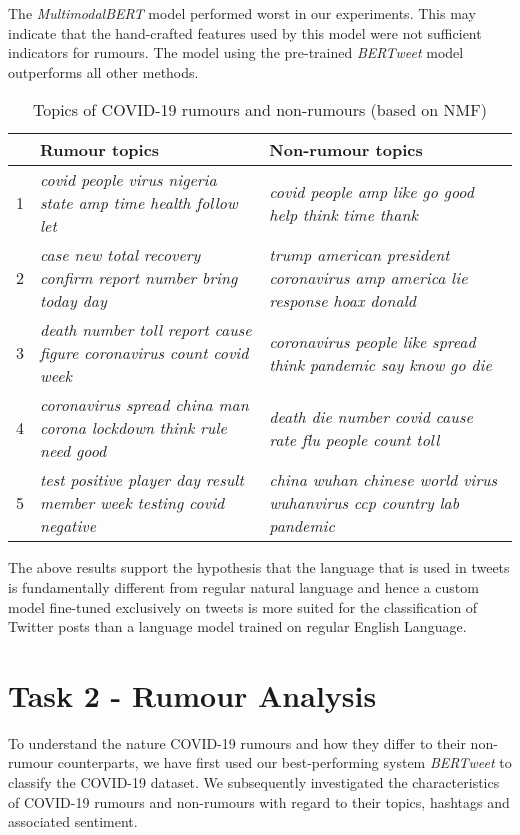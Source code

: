 \documentclass[11pt,a4paper]{article}
\begin{document}
The \textit{MultimodalBERT} model performed worst in our experiments. This may indicate that the hand-crafted features used by this model were not sufficient indicators for rumours.
The model using the pre-trained \textit{BERTweet} model outperforms all other methods.
\newline
\begin{table*}[]
\small
\begin{tabularx}{\textwidth}{lXX}
 & \textbf{Rumour topics} & \textbf{Non-rumour topics} \\
 \hline
1 & \textit{covid people virus nigeria state amp time health follow let} & \textit{covid people amp like go good help think time thank} \\
2 & \textit{case new total recovery confirm report number bring today day} & \textit{trump american president coronavirus amp america lie response hoax donald} \\
3 & \textit{death number toll report cause figure coronavirus count covid week} & \textit{coronavirus people like spread think pandemic say know go die}  \\
4 & \textit{coronavirus spread china man corona lockdown think rule need good} & \textit{death die number covid cause rate flu people count toll}  \\
5 & \textit{test positive player day result member week testing covid negative} & \textit{china wuhan chinese world virus wuhanvirus ccp country lab pandemic} \\
\hline
\end{tabularx}
\caption{Topics of COVID-19 rumours and non-rumours (based on NMF)}
\label{tab:topics_of_covid-19}
\end{table*}
The above results support the hypothesis that the language that is used in tweets is fundamentally different from regular natural language and hence a custom model fine-tuned exclusively on tweets is more suited for the classification of Twitter posts than a language model trained on regular English Language.

\section{Task 2 - Rumour Analysis}
To  understand the nature COVID-19 rumours and how they differ to their non-rumour counterparts, we have first used our best-performing system \textit{BERTweet} to classify the COVID-19 dataset. We subsequently investigated the characteristics of COVID-19 rumours and non-rumours with regard to their topics, hashtags and associated sentiment.
\end{document}
